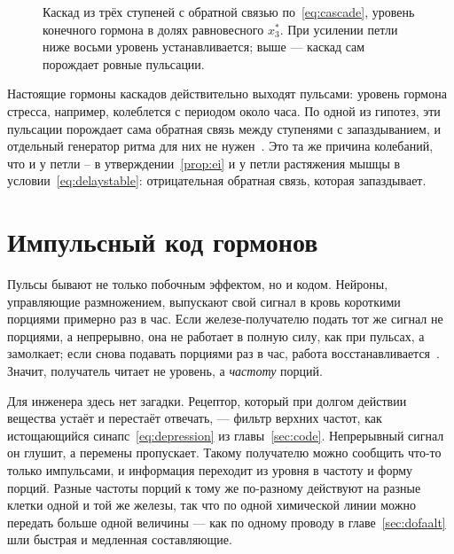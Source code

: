 \begin{figure}[t]
\centering
{}
\caption{Каскад из трёх ступеней с обратной связью по~\eqref{eq:cascade}, уровень конечного гормона в долях равновесного $x_3^*$. При усилении петли ниже восьми уровень устанавливается; выше --- каскад сам порождает ровные пульсации.}
\label{fig:cascade}
\end{figure}

Настоящие гормоны каскадов действительно выходят пульсами: уровень гормона стресса, например, колеблется с периодом около часа. По одной из гипотез, эти пульсации порождает сама обратная связь между ступенями с запаздыванием, и отдельный генератор ритма для них не нужен~\cite{Walker2010}. Это та же причина колебаний, что и у петли -- в утверждении~\ref{prop:ei} и у петли растяжения мышцы в условии~\eqref{eq:delaystable}: отрицательная обратная связь, которая запаздывает.

\section{Импульсный код гормонов}

Пульсы бывают не только побочным эффектом, но и кодом. Нейроны, управляющие размножением, выпускают свой сигнал в кровь короткими порциями примерно раз в час. Если железе-получателю подать тот же сигнал не порциями, а непрерывно, она не работает в полную силу, как при пульсах, а замолкает; если снова подавать порциями раз в час, работа восстанавливается~\cite{Belchetz1978}. Значит, получатель читает не уровень, а \emph{частоту} порций.

Для инженера здесь нет загадки. Рецептор, который при долгом действии вещества устаёт и перестаёт отвечать, --- фильтр верхних частот, как истощающийся синапс~\eqref{eq:depression} из главы~\ref{sec:code}. Непрерывный сигнал он глушит, а перемены пропускает. Такому получателю можно сообщить что-то только импульсами, и информация переходит из уровня в частоту и форму порций. Разные частоты порций к тому же по-разному действуют на разные клетки одной и той же железы, так что по одной химической линии можно передать больше одной величины --- как по одному проводу  в главе~\ref{sec:dofaalt} шли быстрая и медленная составляющие.

